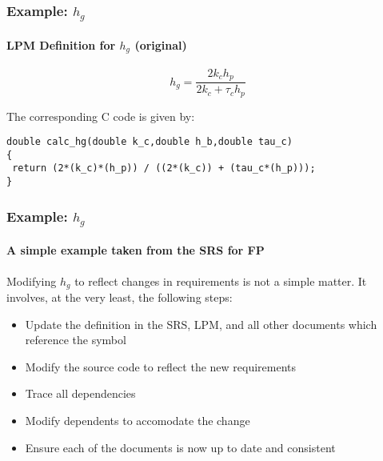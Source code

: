 \documentclass{beamer}
\begin{document}

\begin{frame}[fragile]

\frametitle{Example: $h_g$}

\framesubtitle{LPM Definition for $h_g$ (original)}

\begin{equation} 
h_{g} =\frac{2k_{c}h_{p}}{2k_{c}+\tau_c h_{p}}
\end{equation}

The corresponding C code is given by:

\begin{lstlisting}[basicstyle=\tiny]
double calc_hg(double k_c,double h_b,double tau_c)
{
 return (2*(k_c)*(h_p)) / ((2*(k_c)) + (tau_c*(h_p)));
}
\end{lstlisting}

\end{frame}


%
%
%


\begin{frame}

\frametitle{Example: $h_g$}

\framesubtitle{A simple example taken from the SRS for FP}

Modifying $h_g$ to reflect changes in requirements is not a simple
matter. It involves, at the very least, the following steps:
\begin{itemize}
\item Update the definition in the SRS, LPM, and all other documents which
  reference the symbol
\item Modify the source code to reflect the new requirements
\item Trace all dependencies
\item Modify dependents to accomodate the change
\item Ensure each of the documents is now up to date and consistent
\end{itemize}

\end{frame}

\end{document}
